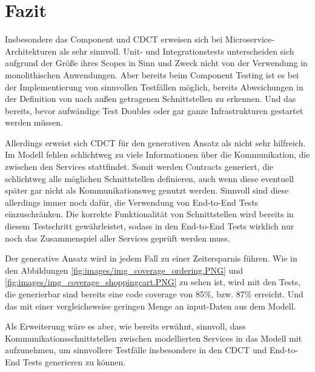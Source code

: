 \documentclass[12pt,a4paper,bibliography=totocnumbered,listof=totocnumbered]{scrartcl}
\begin{document}
\section{Fazit}\label{ch:fazit}

Insbesondere das Component und \acf{CDCT} erweisen sich bei Microservice-Architekturen als sehr sinnvoll. Unit- und Integrationstests unterscheiden sich aufgrund der Größe ihres Scopes in Sinn und Zweck nicht von der Verwendung in monolithischen Anwendungen. Aber bereits beim Component Testing ist es bei der Implementierung von sinnvollen Testfällen möglich, bereits Abweichungen in der Definition von nach außen getragenen Schnittstellen zu erkennen. Und das bereits, bevor aufwändige Test Doubles oder gar ganze Infrastrukturen gestartet werden müssen.

Allerdings erweist sich \ac{CDCT} für den generativen Ansatz als nicht sehr hilfreich. Im Modell fehlen schlichtweg zu viele Informationen über die Kommunikation, die zwischen den Services stattfindet. Somit werden Contracts generiert, die schlichtweg alle möglichen Schnittstellen definieren, auch wenn diese eventuell später gar nicht als Kommunikationsweg genutzt werden. Sinnvoll sind diese allerdings immer noch dafür, die Verwendung von End-to-End Tests einzuschränken. Die korrekte Funktionalität von Schnittstellen wird bereits in diesem Testschritt gewährleistet, sodass in den End-to-End Tests wirklich nur noch das Zusammenspiel aller Services geprüft werden muss.

Der generative Ansatz wird in jedem Fall zu einer Zeitersparnis führen. Wie in den Abbildungen \ref{fig:images/img_coverage_ordering.PNG} und \ref{fig:images/img_coverage_shoppingcart.PNG} zu sehen ist, wird mit den Tests, die generierbar sind bereits eine code coverage von 85\%, bzw. 87\% erreicht. Und das mit einer vergleichsweise geringen Menge an input-Daten aus dem Modell.


Als Erweiterung wäre es aber, wie bereits erwähnt, sinnvoll, dass Kommunikationsschnittstellen zwischen modellierten Services in das Modell mit aufzunehmen, um sinnvollere Testfälle insbesondere in den \ac{CDCT} und End-to-End Tests generieren zu können.
\end{document}
